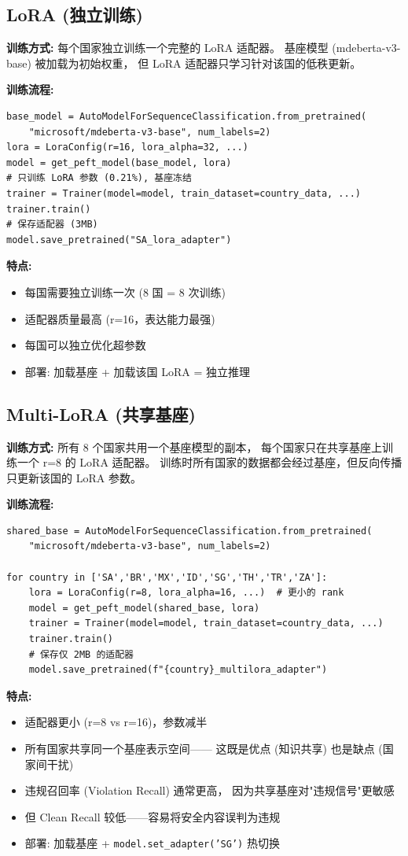 \documentclass[11pt,a4paper]{article}
\begin{document}
\subsection{LoRA (独立训练)}

\textbf{训练方式:} 每个国家独立训练一个完整的 LoRA 适配器。
基座模型 (mdeberta-v3-base) 被加载为初始权重，
但 LoRA 适配器只学习针对该国的低秩更新。

\textbf{训练流程:}
\begin{verbatim}
base_model = AutoModelForSequenceClassification.from_pretrained(
    "microsoft/mdeberta-v3-base", num_labels=2)
lora = LoraConfig(r=16, lora_alpha=32, ...)
model = get_peft_model(base_model, lora)
# 只训练 LoRA 参数 (0.21%), 基座冻结
trainer = Trainer(model=model, train_dataset=country_data, ...)
trainer.train()
# 保存适配器 (3MB)
model.save_pretrained("SA_lora_adapter")
\end{verbatim}

\textbf{特点:}
\begin{itemize}
\item 每国需要独立训练一次 (8 国 = 8 次训练)
\item 适配器质量最高 (r=16，表达能力最强)
\item 每国可以独立优化超参数
\item 部署: 加载基座 + 加载该国 LoRA = 独立推理
\end{itemize}

\subsection{Multi-LoRA (共享基座)}

\textbf{训练方式:} 所有 8 个国家共用一个基座模型的副本，
每个国家只在共享基座上训练一个 r=8 的 LoRA 适配器。
训练时所有国家的数据都会经过基座，但反向传播只更新该国的 LoRA 参数。

\textbf{训练流程:}
\begin{verbatim}
shared_base = AutoModelForSequenceClassification.from_pretrained(
    "microsoft/mdeberta-v3-base", num_labels=2)

for country in ['SA','BR','MX','ID','SG','TH','TR','ZA']:
    lora = LoraConfig(r=8, lora_alpha=16, ...)  # 更小的 rank
    model = get_peft_model(shared_base, lora)
    trainer = Trainer(model=model, train_dataset=country_data, ...)
    trainer.train()
    # 保存仅 2MB 的适配器
    model.save_pretrained(f"{country}_multilora_adapter")
\end{verbatim}

\textbf{特点:}
\begin{itemize}
\item 适配器更小 (r=8 vs r=16)，参数减半
\item 所有国家共享同一个基座表示空间——
这既是优点 (知识共享) 也是缺点 (国家间干扰)
\item 违规召回率 (Violation Recall) 通常更高，
因为共享基座对"违规信号"更敏感
\item 但 Clean Recall 较低——容易将安全内容误判为违规
\item 部署: 加载基座 + \texttt{model.set\_adapter('SG')} 热切换
\end{itemize}
\end{document}
